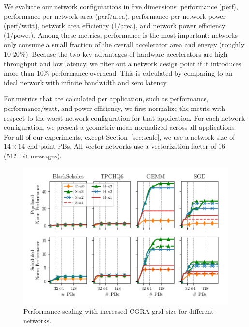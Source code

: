 We evaluate our network configurations in five dimensions: performance (perf), performance per network area (perf/area), performance per network
power (perf/watt), network area efficiency (1/area), and network power efficiency (1/power). 
Among these metrics, performance is the most important: networks only consume a small fraction of the overall accelerator area and energy (roughly 10-20\%). 
Because the two key advantages of hardware accelerators are high throughput and low latency, 
we filter out a network design point if it introduces
more than 10\% performance overhead.
This is calculated by comparing to an ideal network with infinite bandwidth and zero latency.

For metrics that are calculated per application, such as performance, performance/watt, and power efficiency, we first normalize the metric with respect to the 
worst network configuration for that application. 
For each network configuration, we present a geometric mean normalized across all applications. 
For all of our experiments, except Section~\ref{sec:scale}, we use a network
size of $14\times14$ end-point PBs. All vector networks use a vectorization factor of 16 (\SI{512}{bit} messages).

\begin{figure}
\centering
\includegraphics[width=1\columnwidth]{figs/scale.pdf}
\caption{Performance scaling with increased CGRA grid size for different networks.}\label{fig:scale}
\end{figure}
